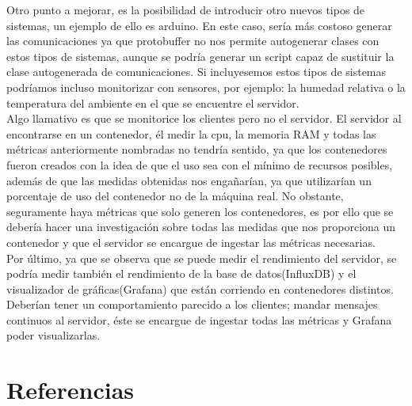 \documentclass[ spanish, a4paper, 12pt, oneside]{report}
\begin{document}
Otro punto a mejorar, es la posibilidad de introducir otro nuevos tipos de sistemas, un ejemplo de ello es arduino. En este caso, sería más costoso generar las comunicaciones ya que protobuffer no nos permite autogenerar clases con estos tipos de sistemas, aunque se podría generar un script capaz de sustituir la clase autogenerada de comunicaciones. Si incluyesemos estos 
tipos de sistemas podríamos incluso monitorizar con sensores, por ejemplo: la humedad relativa o la temperatura del ambiente en el que se encuentre el servidor. \\

Algo llamativo es que se monitorice los clientes pero no el servidor. El servidor al encontrarse en un contenedor, él medir la cpu, la memoria RAM y todas las métricas anteriormente nombradas no tendría sentido, ya que los contenedores fueron creados con la idea de que el uso sea con el mínimo de recursos posibles, además de que las medidas obtenidas nos engañarían, ya que 
utilizarían un porcentaje de uso del contenedor no de la máquina real. No obstante, seguramente haya métricas que solo generen los contenedores, es por ello que se debería hacer una investigación sobre todas las medidas que nos proporciona un contenedor y que el servidor se encargue de ingestar las métricas necesarias.\\ 

Por último, ya que se observa que se puede medir el rendimiento del servidor, se podría medir también el rendimiento de la base de datos(InfluxDB) y el visualizador de gráficas(Grafana) que están corriendo en contenedores distintos. Deberían tener un comportamiento parecido a los clientes; mandar mensajes continuos al servidor, éste se encargue de ingestar todas las métricas 
y Grafana poder visualizarlas.\\

\chapter{Referencias}
\end{document}
